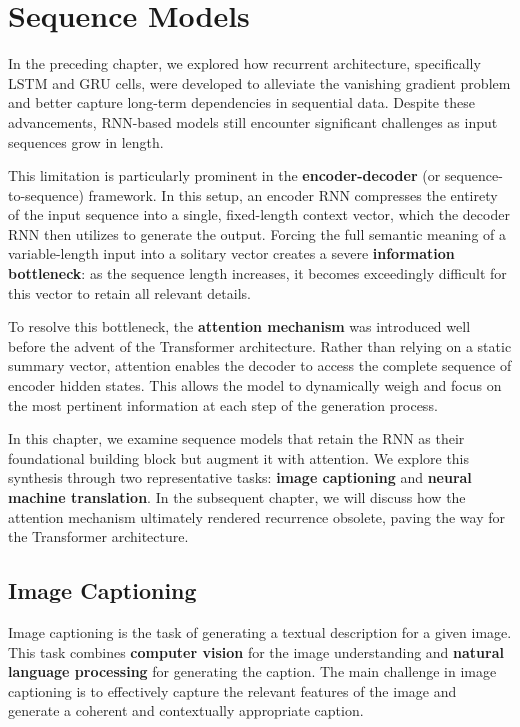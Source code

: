 \section{Sequence Models}

In the preceding chapter, we explored how recurrent architecture, specifically LSTM and GRU cells, were developed to alleviate
the vanishing gradient problem and better capture long-term dependencies in sequential data.
Despite these advancements, RNN-based models still encounter significant challenges as input sequences grow in length.

This limitation is particularly prominent in the \textbf{encoder-decoder} (or sequence-to-sequence) framework.
In this setup, an encoder RNN compresses the entirety of the input sequence into a single, fixed-length context vector, which the decoder RNN then utilizes to generate the output.
Forcing the full semantic meaning of a variable-length input into a solitary vector creates a severe \textbf{information bottleneck}:
as the sequence length increases, it becomes exceedingly difficult for this vector to retain all relevant details.

To resolve this bottleneck, the \textbf{attention mechanism} was introduced well before the advent of the Transformer architecture.
Rather than relying on a static summary vector, attention enables the decoder to access the complete sequence of encoder hidden states.
This allows the model to dynamically weigh and focus on the most pertinent information at each step of the generation process.

In this chapter, we examine sequence models that retain the RNN as their foundational building block but augment it with attention.
We explore this synthesis through two representative tasks: \textbf{image captioning} and \textbf{neural machine translation}.
In the subsequent chapter, we will discuss how the attention mechanism ultimately rendered recurrence obsolete, paving the way for the Transformer architecture.

\subsection{Image Captioning}
Image captioning is the task of generating a textual description for a given image. This task combines \textbf{computer vision} for the image understanding
and \textbf{natural language processing} for generating the caption.
The main challenge in image captioning is to effectively capture the relevant features of the image and generate a coherent and contextually appropriate caption.

